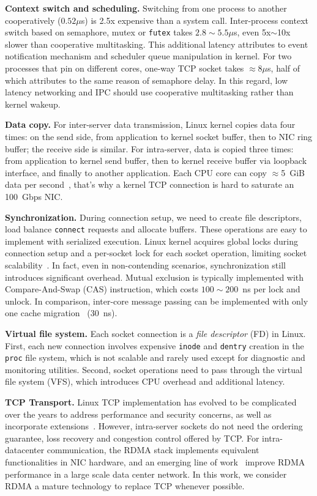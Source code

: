 \textbf{Context switch and scheduling.}
Switching from one process to another cooperatively ($0.52\mu$s) is 2.5x expensive than a system call. Inter-process context switch based on semaphore, mutex or \texttt{futex} takes $2.8\sim5.5\mu$s, even 5x$\sim$10x slower than cooperative multitasking. This additional latency attributes to event notification mechanism and scheduler queue manipulation in kernel. For two processes that pin on different cores, one-way TCP socket takes $\approx8\mu$s, half of which attributes to the same reason of semaphore delay. In this regard, low latency networking and IPC should use cooperative multitasking rather than kernel wakeup.

\textbf{Data copy.}
For inter-server data transmission, Linux kernel copies data four times: on the send side, from application to kernel socket buffer, then to NIC ring buffer; the receive side is similar. For intra-server, data is copied three times: from application to kernel send buffer, then to kernel receive buffer via loopback interface, and finally to another application. Each CPU core can copy $\approx$5~GiB data per second~\cite{panda2016netbricks}, that's why a kernel TCP connection is hard to saturate an 100~Gbps NIC.

\textbf{Synchronization.}
During connection setup, we need to create file descriptors, load balance \texttt{connect} requests and allocate buffers. These operations are easy to implement with serialized execution. Linux kernel acquires global locks during connection setup and a per-socket lock for each socket operation, limiting socket scalability~\cite{boyd2010analysis,han2012megapipe,lin2016scalable}. In fact, even in non-contending scenarios, synchronization still introduces significant overhead. Mutual exclusion is typically implemented with Compare-And-Swap (CAS) instruction, which costs $100\sim200$~ns per lock and unlock. In comparison, inter-core message passing can be implemented with only one cache migration~\cite{roghanchi2017ffwd} (30~ns).

\textbf{Virtual file system.}
Each socket connection is a \textit{file descriptor} (FD) in Linux. First, each new connection involves expensive \texttt{inode} and \texttt{dentry} creation in the \texttt{proc} file system, which is not scalable and rarely used except for diagnostic and monitoring utilities. Second, socket operations need to pass through the virtual file system (VFS), which introduces CPU overhead and additional latency.

\textbf{TCP Transport.}
Linux TCP implementation has evolved to be complicated over the years to address performance and security concerns, as well as incorporate extensions~\cite{yasukata2016stackmap}. However, intra-server sockets do not need the ordering guarantee, loss recovery and congestion control offered by TCP. For intra-datacenter communication, the RDMA stack implements equivalent functionalities in NIC hardware, and an emerging line of work~\cite{zhu2015congestion,guo2016rdma,lu2017memory,mprdma} improve RDMA performance in a large scale data center network. In this work, we consider RDMA a mature technology to replace TCP whenever possible.

